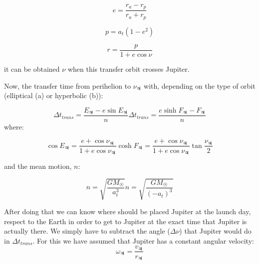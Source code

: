 \begin{equation}
	e = \frac{r_a - r_p}{r_a + r_p}
\end{equation}

\begin{equation}
	p = a_t(1-e^2)
\end{equation}

\begin{equation}
	r = \frac{p}{1 + e \cos{\nu}}
\end{equation}

it can be obtained $\nu$ when this transfer orbit crosses Jupiter.

Now, the transfer time from perihelion to $\nu_{\jupiter}$ with,
depending on the type of orbit (elliptical (a) or hyperbolic (b)):

\begin{subequations}
\begin{equation}
	\Delta t_{trans} = \frac{E_{\jupiter} - e \sin{E_{\jupiter}}}{n}
\end{equation}
\begin{equation}
	\Delta t_{trans} = \frac{e \sinh{F_{\jupiter}} - F_{\jupiter}}{n}
\end{equation}
\end{subequations}
where:

\begin{subequations}
\begin{equation}
	\cos{E_{\jupiter}} = \frac{e + \cos{\nu_{\jupiter}}}{1 + e \cos{\nu_{\jupiter}}}
\end{equation}
\begin{equation}
	\cosh{F_{\jupiter}} = \frac{e + \cos{\nu_{\jupiter}}}{1 + e \cos{\nu_{\jupiter}}} \tan{\frac{\nu_{\jupiter}}{2}}
\end{equation}
\end{subequations}

and the mean motion, $n$:

\begin{subequations}
\begin{equation}
	n = \sqrt{\frac{GM_{\astrosun}}{a_t^3}}
\end{equation}
\begin{equation}
	n = \sqrt{\frac{GM_{\astrosun}}{(-a_t)^3}}
\end{equation}
\end{subequations}

After doing that we can know where should be placed Jupiter at the launch day,
respect to the Earth in order to get to Jupiter at the exact time that Jupiter is
actually there. We simply have to subtract the angle ($\Delta \nu$) that Jupiter
would do in $\Delta t_{trans}$. For this we have assumed that Jupiter has a constant
angular velocity:
\begin{equation}
	\omega_{\jupiter} = \frac{v_{\jupiter}}{r_{\jupiter}}
\end{equation}

